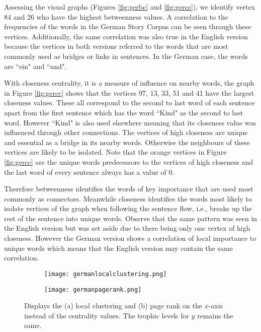 Assessing the visual graphs (Figures \ref{fig:gerbc} and \ref{fig:gercc}), we identify vertex 84 and 26 who have the highest betweenness  values. A correlation to the frequencies of the words in the German Story Corpus can be seen through these vertices. Additionally, the same correlation was also true in the English version because the vertices in both versions referred to the words that are most commonly used as bridges or links in sentences. In the German case, the words are ``ein" and ``und".

With closeness centrality, it is a measure of influence on nearby words, the graph in Figure \ref{fig:gercc} shows that the vertices 97, 13, 33, 51 and 41 have the largest closeness values. These all correspond to the second to last word of each sentence apart from the first sentence which has the word ``Kind" as the second to last word. However ``Kind" is also used elsewhere meaning that its closeness value was influenced through other connections. The vertices of high closeness are unique and essential as a bridge in its nearby words. Otherwise the neighbours of these vertices are likely to be isolated. Note that the orange vertices in Figure \ref{fig:gercc} are the unique words predecessors to the vertices of high closeness and the last word of every sentence always has a value of $0$.

Therefore betweenness identifies the words of key importance that are used most commonly as connectors. Meanwhile closeness identifies the words most likely to isolate vertices of the graph when following the sentence flow, i.e., breaks up the rest of the sentence into unique words. Observe that the same pattern was seen in the English version but was set aside due to there being only one vertex of high closeness. However the German version shows a correlation of local importance to unique words which means that the English version may contain the same correlation.

\begin{figure}[H]
\centering
\begin{subfigure}{.45\textwidth}
	\hspace{-1cm} 
	\texttt{[image: germanlocalclustering.png]}
	\caption{}
	\label{fig:gerlc}
\end{subfigure}
\hfill
\begin{subfigure}{.45\textwidth}
	\hspace{-1cm} 
	\texttt{[image: germanpagerank.png]}
	\caption{}
	\label{fig:gerpr}
\end{subfigure}
\caption{Displays the (a) local clustering and (b) page rank on the $x$-axis instead of the centrality values. The trophic levels for $y$ remains the same.}
\label{fig:gerother}
\end{figure}

